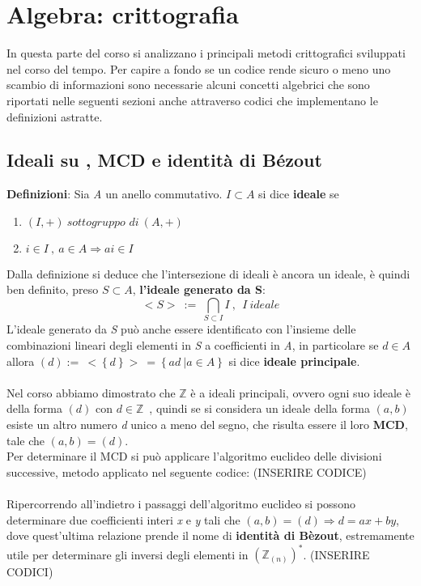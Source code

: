 \documentclass{article}
\begin{document}
\section{Algebra: crittografia}
In questa parte del corso si analizzano i principali metodi crittografici sviluppati nel corso del tempo. Per capire a fondo se un codice rende sicuro o meno uno scambio di informazioni sono necessarie alcuni concetti algebrici che sono riportati nelle seguenti sezioni anche attraverso codici che implementano le definizioni astratte.
\subsection{Ideali su , MCD e identità di Bézout}
\textbf{Definizioni}: Sia \textit{A} un anello commutativo. \(I\subset A\) si dice \textbf{ideale} se\\ \begin{enumerate}
\item \((I,+)\ \textit{sottogruppo di}\ (A,+)\)
\item \(i\in I\ ,\ a\in A\Rightarrow ai\in I \)
\end{enumerate}
Dalla definizione si deduce che l'intersezione di ideali è ancora un ideale, è quindi ben definito, preso \(S\subset A\), \textbf{l'ideale generato da S}:
\[<S>\ :=\ \bigcap_{S\subset I} I\ ,\ \ I\ ideale\]
L'ideale generato da \textit{S} può anche essere identificato con l'insieme delle combinazioni lineari degli elementi in \textit{S} a coefficienti in \textit{A}, in particolare se \(d\in A\) allora \((d):= \ <\left\{d\right\}>\ =\left\{ad \ |a\in A\right\}\) si dice \textbf{ideale principale}.\\ \\
Nel corso abbiamo dimostrato che \(\mathbb{Z}\) è a ideali principali, ovvero ogni suo ideale è della forma \((d)\) con \(d\in\mathbb{Z}\)\ , quindi se si considera un ideale della forma \((a,b)\) esiste un altro numero \textit{d} unico a meno del segno, che risulta essere il loro \textbf{MCD}, tale che \((a,b)=(d)\).\\ Per determinare il MCD si può applicare l'algoritmo euclideo delle divisioni successive, metodo applicato nel seguente codice: (INSERIRE CODICE)\\ \\
Ripercorrendo all'indietro i passaggi dell'algoritmo euclideo si possono determinare due coefficienti interi \textit{x} e \textit{y} tali che \((a,b)=(d)\Rightarrow d=ax+by\), dove quest'ultima relazione prende il nome di \textbf{identità di Bèzout}, estremamente utile per determinare gli inversi degli elementi in \((\mathbb{Z}_{(n)})^*\). (INSERIRE CODICI)\\ \\
\end{document}
